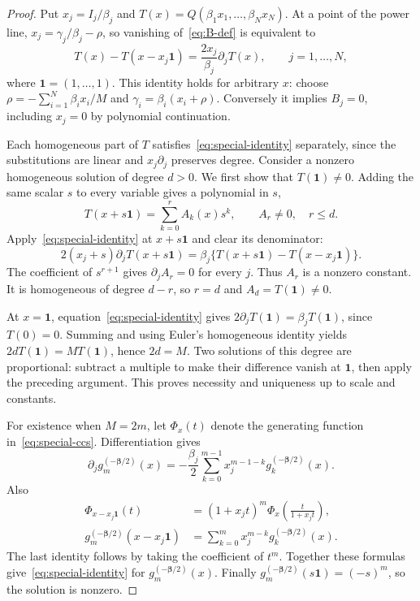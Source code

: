 \documentclass[11pt]{article}
\begin{document}
\begin{proof}
Put $x_j=I_j/\beta_j$ and
$T(x)=Q(\beta_1x_1,\ldots,\beta_Nx_N)$.
At a point of the power line, $x_j=\gamma_j/\beta_j-\rho$, so
vanishing of~\eqref{eq:B-def} is equivalent to
\begin{equation}\label{eq:special-identity}
 T(x)-T(x-x_j\mathbf1)
 =\frac{2x_j}{\beta_j}\partial_jT(x),\qquad j=1,\ldots,N,
\end{equation}
where $\mathbf1=(1,\ldots,1)$. This identity holds for arbitrary $x$:
choose $\rho=-\sum_{i=1}^{N}\beta_i x_i/M$ and
$\gamma_i=\beta_i(x_i+\rho)$. Conversely it implies $B_j=0$, including
$x_j=0$ by polynomial continuation.

Each homogeneous part of $T$ satisfies~\eqref{eq:special-identity}
separately, since the substitutions are linear and $x_j\partial_j$
preserves degree. Consider a nonzero homogeneous solution of degree $d>0$.
We first show that $T(\mathbf1)\ne0$. Adding the same scalar $s$ to every
variable gives a polynomial in $s$,
\[
 T(x+s\mathbf1)=\sum_{k=0}^r A_k(x)s^k,\qquad A_r\ne0,\quad r\le d.
\]
Apply~\eqref{eq:special-identity} at $x+s\mathbf1$ and clear its denominator:
\[
 2(x_j+s)\partial_jT(x+s\mathbf1)
 =\beta_j\{T(x+s\mathbf1)-T(x-x_j\mathbf1)\}.
\]
The coefficient of $s^{r+1}$ gives $\partial_jA_r=0$ for every $j$.
Thus $A_r$ is a nonzero constant. It is homogeneous of degree $d-r$,
so $r=d$ and $A_d=T(\mathbf1)\ne0$.

At $x=\mathbf1$, equation~\eqref{eq:special-identity} gives
$2\partial_jT(\mathbf1)=\beta_jT(\mathbf1)$, since $T(0)=0$.
Summing and using Euler's homogeneous identity yields
$2dT(\mathbf1)=MT(\mathbf1)$, hence $2d=M$.
Two solutions of this degree are proportional: subtract a multiple to
make their difference vanish at $\mathbf1$, then apply the preceding
argument. This proves necessity and uniqueness up to scale and constants.

For existence when $M=2m$, let $\Phi_x(t)$ denote the generating
function in~\eqref{eq:special-ccs}. Differentiation gives
\[
 \partial_jg_m^{(-\boldsymbol\beta/2)}(x)=-\frac{\beta_j}{2}
             \sum_{k=0}^{m-1}x_j^{m-1-k}g_k^{(-\boldsymbol\beta/2)}(x).
\]
Also
\[
 \begin{aligned}
 \Phi_{x-x_j\mathbf1}(t)
 &=(1+x_jt)^m\Phi_x\!\left(\frac{t}{1+x_jt}\right),\\
 g_m^{(-\boldsymbol\beta/2)}(x-x_j\mathbf1)
 &=\sum_{k=0}^m x_j^{m-k}g_k^{(-\boldsymbol\beta/2)}(x).
 \end{aligned}
\]
The last identity follows by taking the coefficient of $t^m$.
Together these formulas give~\eqref{eq:special-identity} for
$g_m^{(-\boldsymbol\beta/2)}(x)$.
Finally $g_m^{(-\boldsymbol\beta/2)}(s\mathbf1)=(-s)^m$,
so the solution is nonzero.
\end{proof}
\end{document}
